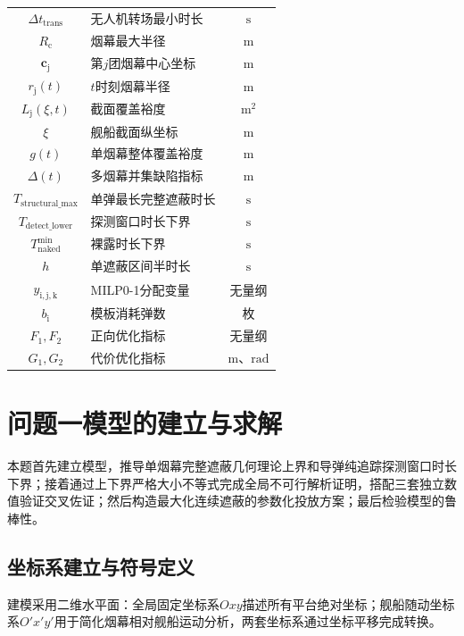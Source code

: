 \documentclass[withoutpreface,bwprint]{cumcmthesis}
\begin{document}
\begin{longtable}{c m{} c}
	$\Delta t_{\mathrm{trans}}$ & 无人机转场最小时长 & $\mathrm{s}$ \\
	$R_{\mathrm{c}}$ & 烟幕最大半径 & $\mathrm{m}$ \\
	$\bm{c}_{\mathrm{j}}$ & 第$j$团烟幕中心坐标 & $\mathrm{m}$ \\
	$r_{\mathrm{j}}(t)$ & $t$时刻烟幕半径 & $\mathrm{m}$ \\
	$L_{\mathrm{j}}(\xi,t)$ & 截面覆盖裕度 & $\mathrm{m}^2$ \\
	$\xi$ & 舰船截面纵坐标 & $\mathrm{m}$ \\
	$g(t)$ & 单烟幕整体覆盖裕度 & $\mathrm{m}$ \\
	$\Delta(t)$ & 多烟幕并集缺陷指标 & $\mathrm{m}$ \\
	$T_{\mathrm{structural\_max}}$ & 单弹最长完整遮蔽时长 & $\mathrm{s}$ \\
	$T_{\mathrm{detect\_lower}}$ & 探测窗口时长下界 & $\mathrm{s}$ \\
	$T_{\mathrm{naked}}^{\min}$ & 裸露时长下界 & $\mathrm{s}$ \\
	$h$ & 单遮蔽区间半时长 & $\mathrm{s}$ \\
	$y_{\mathrm{i},\mathrm{j},\mathrm{k}}$ & MILP0-1分配变量 & 无量纲 \\
	$b_{\mathrm{i}}$ & 模板消耗弹数 & 枚 \\
	$F_1,F_2$ & 正向优化指标 & 无量纲 \\
	$G_1,G_2$ & 代价优化指标 & $\mathrm{m}$、$\mathrm{rad}$ \\
\end{longtable}


\newpage

\section{问题一模型的建立与求解}

本题首先建立模型，推导单烟幕完整遮蔽几何理论上界和导弹纯追踪探测窗口时长下界；接着通过上下界严格大小不等式完成全局不可行解析证明，搭配三套独立数值验证交叉佐证；然后构造最大化连续遮蔽的参数化投放方案；最后检验模型的鲁棒性。

\subsection{坐标系建立与符号定义}
建模采用二维水平面：全局固定坐标系$Oxy$描述所有平台绝对坐标；舰船随动坐标系$O'x'y'$用于简化烟幕相对舰船运动分析，两套坐标系通过坐标平移完成转换。
\end{document}
